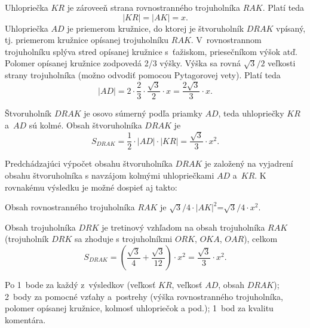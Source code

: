 {%
Uhlopriečka $KR$ je zároveeň strana rovnostranného trojuholníka $RAK$.
Platí teda
$$|KR|=|AK|=x.
$$
Uhlopriečka $AD$ je priemerom kružnice, do ktorej je štvoruholník $DRAK$ vpísaný, tj. priemerom kružnice opísanej trojuholníku $RAK$.
V~rovnostrannom trojuholníku splýva stred opísanej kružnice s~ťažiskom, priesečníkom výšok atď.
Polomer opísanej kružnice zodpovedá 2/3 výšky. Výška sa rovná $\sqrt3/2$ veľkosti strany trojuholníka
(možno odvodiť pomocou Pytagorovej vety).
Platí teda
$$
|AD| = 2\cdot\frac23\cdot\frac{\sqrt3}{2}\cdot x
= \frac{2\sqrt3}3\cdot x.
$$

Štvoruholník $DRAK$ je osovo súmerný podľa priamky $AD$, teda uhlopriečky $KR$ a~$AD$ sú kolmé.
Obsah štvoruholníka $DRAK$ je
$$
S_{DRAK} = \frac12\cdot|AD|\cdot|KR|
= \frac{\sqrt3}3\cdot x^2 .
$$
%

\poznamky
Predchádzajúci výpočet obsahu štvoruholníka $DRAK$ je založený na vyjadrení obsahu štvoruholníka s navzájom kolmými uhlopriečkami $AD$ a~$KR$.
K rovnakému výsledku je možné dospieť aj takto:

Obsah rovnostranného trojuholníka $RAK$ je $\sqrt3/4\cdot|AK|^2$=$\sqrt3/4\cdot x^2$.

Obsah trojuholníka $DRK$ je tretinový vzhľadom na obsah trojuholníka $RAK$  (trojuholník $DRK$ sa zhoduje s trojuholníkmi $ORK$, $OKA$, $OAR$),
celkom
$$
S_{DRAK} = \left(\frac{\sqrt3}{4}+\frac{\sqrt3}{12}\right)\cdot x^2 = \frac{\sqrt3}3\cdot x^2 .
$$

\hodnotenie
Po 1~bode za každý z~výsledkov (veľkosť $KR$, veľkosť $AD$, obsah $DRAK$);
2~body za pomocné vzťahy a~postrehy (výška rovnostranného trojuholníka, polomer opísanej kružnice, kolmosť uhlopriečok a pod.);
1~bod za kvalitu komentára.
\endhodnotenie

}

